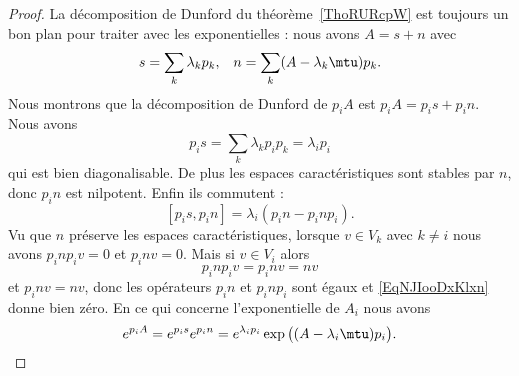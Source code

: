 \begin{proof}
	La décomposition de Dunford du théorème~\ref{ThoRURcpW} est toujours un bon plan pour traiter avec les exponentielles : nous avons \( A=s+n\) avec
	\begin{equation}
		\begin{aligned}[]
			s & =\sum_k\lambda_kp_k, & n=\sum_k(A-\lambda_k\mtu)p_k.
		\end{aligned}
	\end{equation}
	Nous montrons que la décomposition de Dunford de \( p_iA\) est \( p_iA=p_is+p_in\). Nous avons
	\begin{equation}
		p_is=\sum_k\lambda_kp_ip_k=\lambda_ip_i
	\end{equation}
	qui est bien diagonalisable. De plus les espaces caractéristiques sont stables par \( n\), donc \( p_in\) est nilpotent. Enfin ils commutent :
	\begin{equation}    \label{EqNJIooDxKlxn}
		[p_is,p_in]=\lambda_i(p_in-p_inp_i).
	\end{equation}
	Vu que \( n\) préserve les espaces caractéristiques, lorsque \( v\in V_k\) avec \( k\neq i\) nous avons \( p_inp_iv=0\) et \( p_inv=0\). Mais si \( v\in V_i\) alors
	\begin{equation}
		p_inp_iv=p_inv=nv
	\end{equation}
	et \( p_inv=nv\), donc les opérateurs \( p_in\) et \( p_inp_i\) sont égaux et \eqref{EqNJIooDxKlxn} donne bien zéro. En ce qui concerne l'exponentielle de \( A_i\) nous avons
	\begin{equation}
		e^{p_iA}= e^{p_is} e^{p_in}= e^{\lambda_ip_i} \exp\big( (A-\lambda_i\mtu)p_i\big).
	\end{equation}


\end{proof}

